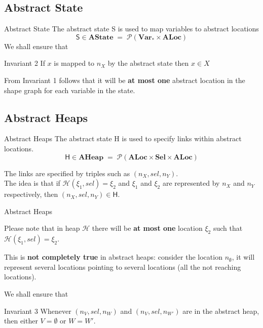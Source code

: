 \documentclass[xcolor=svgnames,11pt]{beamer}
\begin{document}
\subsection{Abstract State}

\begin{frame}{Abstract State}
The abstract state \textsf{S} is used to map variables to abstract locations
$$ \mathsf{S} \in \mathbf{AState} \;=\; \mathcal{P}(\mathbf{Var}_* \times \mathbf{ALoc}) $$
\pause
\medskip
We shall ensure that
\begin{block}{Invariant 2}
\textrm{If $x$ is mapped to $n_X$ by the abstract state then $x \in X$}
\end{block}

\medskip

From Invariant 1 follows that it will be \textbf{at most one} abstract location in the shape graph for each variable in the state.

\end{frame}

\subsection{Abstract Heaps}

\begin{frame}{Abstract Heaps}
The abstract state \textsf{H} is used to specify links within abstract locations. 
$$ \mathsf{H} \in \mathbf{AHeap} \;=\; \mathcal{P}(\mathbf{ALoc} \times \mathbf{Sel} \times \mathbf{ALoc}) $$

\medskip
\pause

The links are specified by triples such as $(n_X, sel, n_Y)$.\\
The idea is that if $\mathcal{H}(\xi_1, sel) = \xi_2$ and $\xi_1$ and $\xi_2$ are represented by $n_X$ and $n_Y$ respectively, then $(n_X, sel, n_Y) \in \mathsf{H}$.

\end{frame}


\begin{frame}{Abstract Heaps}

Please note that in heap $\mathcal{H}$ there will be \textbf{at most one} location $\xi_2$ such that $\mathcal{H}(\xi_1, sel) = \xi_2$.

\medskip
\pause

This is \textbf{not completely true} in abstract heaps: consider the location $n_\emptyset$, it will represent several locations pointing to several locations (all the not reaching locations).

\medskip
\pause

We shall ensure that
\begin{block}{Invariant 3}
\textrm{Whenever $(n_V, sel, n_W)$ and $(n_V, sel, n_{W'})$ are in the abstract heap, then either $V = \emptyset$ or $W = W'$.}
\end{block}
\end{frame}
\end{document}
